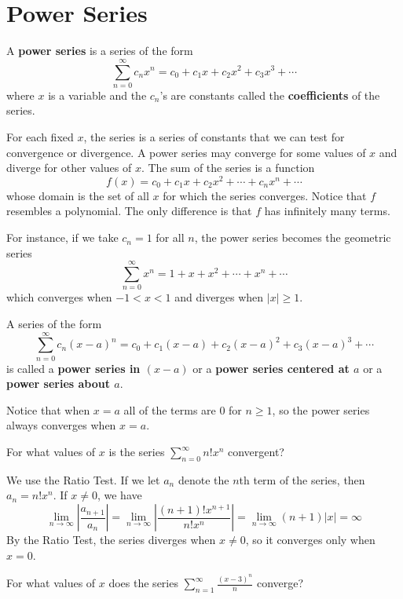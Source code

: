 \section{Power Series}
  \begin{definition}
    A \textbf{power series} is a series of the form
    $$\sum_{n=0}^{\infty} c_n x^n = c_0 + c_1 x + c_2 x^2 + c_3 x^3 + \cdots $$
    where $x$ is a variable and the $c_n$'s are constants called the \textbf{coefficients} of the series.
  \end{definition}
  For each fixed $x$, the series is a series of constants that we can test for convergence or divergence. A power series may converge for some values of $x$ and diverge for other values of $x$. The sum of the series is a function
  $$ f(x) = c_0 + c_1 x + c_2 x^2 + \cdots + c_n x^n + \cdots $$
  whose domain is the set of all $x$ for which the series converges. Notice that $f$ resembles a polynomial. The only difference is that $f$ has infinitely many terms.\par
  For instance, if we take $c_n = 1$ for all $n$, the power series becomes the geometric series
  $$ \sum_{n=0}^{\infty} x^n = 1 + x + x^2 + \cdots + x^n + \cdots $$
  which converges when $-1<x<1$ and diverges when $|x|\geq 1$.
  \begin{definition}
    A series of the form
    $$\sum_{n=0}^{\infty} c_n (x-a)^n = c_0 + c_1 (x-a) + c_2 (x-a)^2 + c_3 (x-a)^3 + \cdots $$
    is called a \textbf{power series in $(x-a)$} or a \textbf{power series centered at $a$} or a \textbf{power series about $a$}.
  \end{definition}
  Notice that when $x=a$ all of the terms are 0 for $n \geq 1$, so the power series always converges when $x=a$.
  \begin{example}
    For what values of $x$ is the series $\displaystyle \sum_{n=0}^{\infty} n!x^n$ convergent?
  \end{example}
  \begin{solution}
    We use the Ratio Test. If we let $a_n$ denote the $n$th term of the series, then $a_n= n!x^n$. If $x \neq 0$, we have
    $$ \lim_{n\to\infty} \left|\frac{a_{n+1}}{a_n}\right| = \lim_{n\to\infty} \left|\frac{(n+1)!x^{n+1}}{n!x^n}\right| = \lim_{n\to\infty} (n+1)|x| = \infty $$
    By the Ratio Test, the series diverges when $x \neq 0$, so it converges only when $x = 0$.
  \end{solution}
  \begin{example}
    For what values of $x$ does the series $\displaystyle \sum_{n=1}^{\infty} \frac{(x-3)^n}{n}$ converge?
  \end{example}
